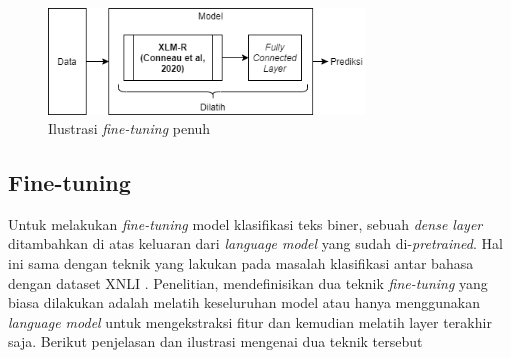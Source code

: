 	\begin{figure}[b]
		\centering
		\includegraphics[width=0.75\textwidth]{resources/Full-fine-tune.png}
		\caption{ Ilustrasi \textit{fine-tuning} penuh}
		\label{fig:ilustrasi_full_fine_tune}
	\end{figure}

	\subsection{Fine-tuning}
	Untuk melakukan \textit{fine-tuning} model klasifikasi teks biner, sebuah \textit{dense layer} ditambahkan di atas keluaran dari \textit{language model} yang sudah di-\textit{pretrained}. Hal ini sama dengan teknik yang \parencite{LampleConneau2019} lakukan pada masalah klasifikasi antar bahasa dengan dataset XNLI \parencite{Conneau_Rinott_Lample_Williams_Bowman_Schwenk_Stoyanov_2018}. Penelitian, \parencite{Devlin_Chang_Lee_Toutanova_2019} mendefinisikan dua teknik \textit{fine-tuning} yang biasa dilakukan adalah melatih keseluruhan model atau hanya menggunakan \textit{language model} untuk mengekstraksi fitur dan kemudian melatih layer terakhir saja. Berikut penjelasan dan ilustrasi mengenai dua teknik tersebut
